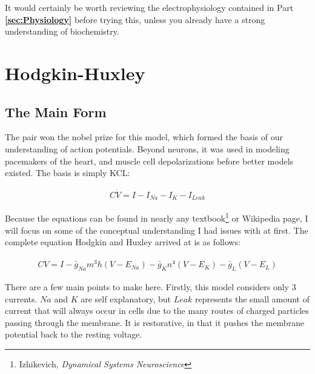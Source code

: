 \documentclass[12pt]{report}
\begin{document}
It would certainly be worth reviewing the electrophysiology contained in Part \textbf{\ref{sec:Physiology}} before trying this, unless you already have a strong understanding of biochemistry.  


\section{Hodgkin-Huxley} 

\subsection{The Main Form} The pair won the nobel prize for this model, which formed the basis of our understanding of action potentials. Beyond neurons, it was used in modeling pacemakers of the heart, and muscle cell depolarizations before better models existed.  The basis is simply KCL: 

\bigskip

\begin{equation} \label{hh1}
\begin{split}
C\dot{V} = I - I_{Na} - I_{K} - I_{Leak}
\end{split}
\end{equation}

\bigskip

Because the equations can be found in nearly any textbook\footnote{Izhikevich, \textit{Dynamical Systems Neuroscience}} or Wikipedia page, I will focus on some of the conceptual understanding I had issues with at first. The complete equation Hodgkin and Huxley arrived at is as follows: 

\bigskip

\begin{equation} \label{hh2}
\begin{split}
C\dot{V} = I - \bar{g}_{Na}m^3h(V - E_{Na}) - \bar{g}_{K}n^4(V - E_{K}) - \bar{g}_{L}(V - E_{L})
\end{split}
\end{equation}

\bigskip 

There are a few main points to make here. Firstly, this model considers only 3 currents. $Na$ and $K$ are self explanatory, but $Leak$ represents the small amount of current that will always occur in cells due to the many routes of charged particles passing through the membrane. It is restorative, in that it pushes the membrane potential back to the resting voltage.\newline
\end{document}
